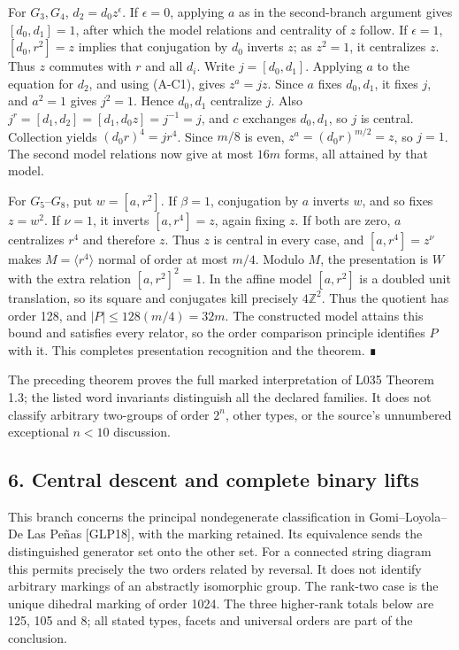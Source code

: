 \documentclass[
  11pt,
  a4paper,
]{article}
\begin{document}
For \(G_3,G_4\), \(d_2=d_0z^\epsilon\). If \(\epsilon=0\), applying
\(a\) as in the second-branch argument gives \([d_0,d_1]=1\), after
which the model relations and centrality of \(z\) follow. If
\(\epsilon=1\), \([d_0,r^2]=z\) implies that conjugation by \(d_0\)
inverts \(z\); as \(z^2=1\), it centralizes \(z\). Thus \(z\) commutes
with \(r\) and all \(d_i\). Write \(j=[d_0,d_1]\). Applying \(a\) to the
equation for \(d_2\), and using (A-C1), gives \(z^a=jz\). Since \(a\)
fixes \(d_0,d_1\), it fixes \(j\), and \(a^2=1\) gives \(j^2=1\). Hence
\(d_0,d_1\) centralize \(j\). Also
\(j^r=[d_1,d_2]=[d_1,d_0z]=j^{-1}=j\), and \(c\) exchanges \(d_0,d_1\),
so \(j\) is central. Collection yields \((d_0r)^4=j r^4\). Since \(m/8\)
is even, \(z^a=(d_0r)^{m/2}=z\), so \(j=1\). The second model relations
now give at most \(16m\) forms, all attained by that model.

For \(G_5\)--\(G_8\), put \(w=[a,r^2]\). If \(\beta=1\), conjugation by
\(a\) inverts \(w\), and so fixes \(z=w^2\). If \(\nu=1\), it inverts
\([a,r^4]=z\), again fixing \(z\). If both are zero, \(a\) centralizes
\(r^4\) and therefore \(z\). Thus \(z\) is central in every case, and
\([a,r^4]=z^\nu\) makes \(M=\langle r^4\rangle\) normal of order at most
\(m/4\). Modulo \(M\), the presentation is \(W\) with the extra relation
\([a,r^2]^2=1\). In the affine model \([a,r^2]\) is a doubled unit
translation, so its square and conjugates kill precisely
\(4\mathbb Z^2\). Thus the quotient has order 128, and
\(|P|\le128(m/4)=32m\). The constructed model attains this bound and
satisfies every relator, so the order comparison principle identifies
\(P\) with it. This completes presentation recognition and the theorem.
∎

The preceding theorem proves the full marked interpretation of L035
Theorem 1.3; the listed word invariants distinguish all the declared
families. It does not classify arbitrary two-groups of order \(2^n\),
other types, or the source's unnumbered exceptional \(n<10\) discussion.

\subsection{6. Central descent and complete binary
lifts}\label{central-descent-and-complete-binary-lifts}

This branch concerns the principal nondegenerate classification in
Gomi--Loyola--De Las Peñas {[}GLP18{]}, with the marking retained. Its
equivalence sends the distinguished generator set onto the other set.
For a connected string diagram this permits precisely the two orders
related by reversal. It does not identify arbitrary markings of an
abstractly isomorphic group. The rank-two case is the unique dihedral
marking of order 1024. The three higher-rank totals below are 125, 105
and 8; all stated types, facets and universal orders are part of the
conclusion.
\end{document}
